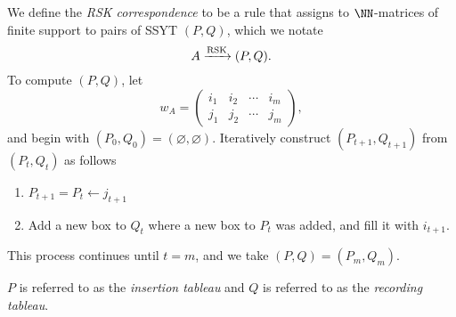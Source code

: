 \documentclass{article}
\DeclareMathOperator{\RSK}{RSK}
\newcommand{\rskarrow}{\ensuremath\xrightarrow{\RSK}}
\begin{document}
\begin{definition}
    We define the \textit{RSK correspondence} to be a rule that assigns to $\NN$-matrices of finite support to pairs of SSYT $(P, Q)$, which we notate
    \[
        A \rskarrow (P, Q).
    \]
    To compute $(P, Q)$, let 
    \[
        w_A = \begin{pmatrix}
            i_1 & i_2 & \cdots & i_m \\
            j_1 & j_2 & \cdots & j_m
        \end{pmatrix},
    \]
    and begin with $(P_0, Q_0) = (\varnothing, \varnothing)$. Iteratively construct $(P_{t+1}, Q_{t+1})$ from $(P_t,Q_t)$ as follows
    \begin{enumerate}[label=(\alph*)]
        \item $P_{t+1} = P_t \leftarrow j_{t+1}$
        \item Add a new box to $Q_t$ where a new box to $P_t$ was added, and fill it with $i_{t+1}$.
    \end{enumerate}
    This process continues until $t=m$, and we take $(P, Q) = (P_m, Q_m)$.

    $P$ is referred to as the \textit{insertion tableau} and $Q$ is referred to as the \textit{recording tableau}.
\end{definition}
\end{document}
